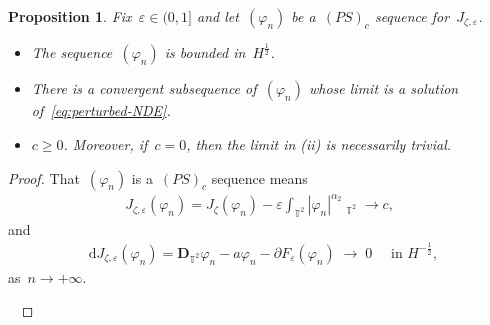 \documentclass[11pt,final]{amsart}
\newcommand{\T}{\mathbb{T}}
\newcommand{\dd}{\mathop{}\!\mathrm{d}}
\newcommand{\eps}{\varepsilon}
\newcommand{\pD}{\mathbf{D}}
\DeclareMathOperator{\dv}{\dd{vol}}
\newtheorem{prop}[thm]{Proposition}
\begin{document}
\begin{prop}\label{prop:PS}
    Fix~$\eps\in (0,1]$ and let~$(\varphi_n)$ be a~$(PS)_c$ sequence for~$J_{\zeta,\eps}$.
    \begin{itemize}
        \item[(i)] The sequence~$(\varphi_n)$ is bounded in~$H^{\frac{1}{2}}$.
        \item[(ii)] There is a convergent subsequence of~$(\varphi_n)$ whose limit is a solution of~\eqref{eq:perturbed-NDE}.
        \item[(iii)] $c\geq 0$. Moreover, if~$c=0$, then the limit in (ii) is necessarily trivial.
    \end{itemize}
\end{prop}

\begin{proof}
    That~$(\varphi_n)$ is a~$(PS)_c$ sequence means
    \begin{align}\label{eq:PS level}
        J_{\zeta,\eps}(\varphi_n)
        =J_\zeta(\varphi_n)- \eps\int_{\T^2} |\varphi_n|^{\alpha_2}\dv_{\T^2} \to c,
    \end{align}
    and
    \begin{align}\label{eq:PS differential}
        \dd J_{\zeta,\eps}(\varphi_n)=\pD_{\T^2}\varphi_n-a\varphi_n-\partial F_\eps(\varphi_n)\; \to \; 0
         \quad \mbox{ in } H^{-\frac{1}{2}},
    \end{align}
    as~$n\to+\infty$.


    \


\end{proof}
\end{document}
